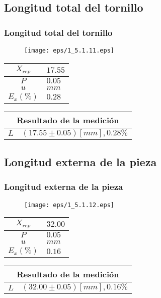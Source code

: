 \documentclass[letter,11pt]{beamer}
\begin{document}
\subsection{Longitud total del tornillo}
\begin{frame}
\frametitle{Longitud total del tornillo}
\vspace*{0.8cm}
\begin{figure}
\centering
\texttt{[image: eps/1\_5.1.11.eps]}
\end{figure}
\vspace*{0.4cm}
\scriptsize
\begin{tabular}{|c|>{\centering}m{1.8cm}<{\centering}|}
\hline
$X_{rep}$ &  $17.55$ \tabularnewline \hline
      $P$ &   $0.05$ \tabularnewline \hline
      $u$ &     $mm$ \tabularnewline \hline
$E_x(\%)$ &   $0.28$ \tabularnewline \hline
\end{tabular}
\quad
\begin{tabular}{|c|>{\centering}m{5.7cm}<{\centering}|}
\hline
\multicolumn{2}{|c|}{\textbf{Resultado de la medición}} \\ \hline
$L$ & $( 17.55\pm0.05)[mm], 0.28\%$ \tabularnewline \hline
\end{tabular}
\end{frame}

\subsection{Longitud externa de la pieza}
\begin{frame}
\frametitle{Longitud externa de la pieza}
\vspace*{0.8cm}
\begin{figure}
\centering
\texttt{[image: eps/1\_5.1.12.eps]}
\end{figure}
\vspace*{0.4cm}
\scriptsize
\begin{tabular}{|c|>{\centering}m{1.8cm}<{\centering}|}
\hline
$X_{rep}$ &  $32.00$ \tabularnewline \hline
      $P$ &   $0.05$ \tabularnewline \hline
      $u$ &     $mm$ \tabularnewline \hline
$E_x(\%)$ &   $0.16$ \tabularnewline \hline
\end{tabular}
\quad
\begin{tabular}{|c|>{\centering}m{5.7cm}<{\centering}|}
\hline
\multicolumn{2}{|c|}{\textbf{Resultado de la medición}} \\ \hline
$L$ & $( 32.00\pm0.05)[mm], 0.16\%$ \tabularnewline \hline
\end{tabular}
\end{frame}
\end{document}
